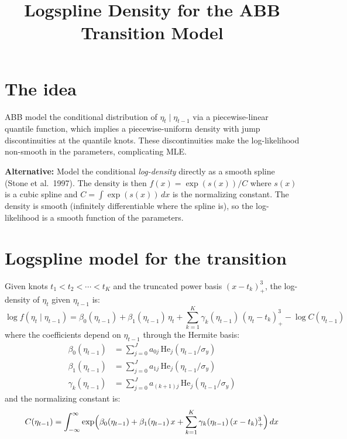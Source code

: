 \documentclass[12pt]{article}
\title{Logspline Density for the ABB Transition Model}
\author{}
\date{}
\begin{document}
\maketitle

\section{The idea}

ABB model the conditional distribution of $\eta_t \mid \eta_{t-1}$
via a piecewise-linear quantile function, which implies a
piecewise-uniform density with jump discontinuities at the
quantile knots.  These discontinuities make the log-likelihood
non-smooth in the parameters, complicating MLE.

\medskip\noindent
\textbf{Alternative:} Model the conditional \emph{log-density}
directly as a smooth spline (Stone et al.\ 1997).  The density is
then $f(x) = \exp(s(x)) / C$ where $s(x)$ is a cubic spline and
$C = \int \exp(s(x))\,dx$ is the normalizing constant.  The density
is smooth (infinitely differentiable where the spline is), so the
log-likelihood is a smooth function of the parameters.

\section{Logspline model for the transition}

Given knots $t_1 < t_2 < \cdots < t_K$ and the truncated power basis
$(x - t_k)_+^3$, the log-density of $\eta_t$ given $\eta_{t-1}$ is:
\begin{equation}
\log f(\eta_t \mid \eta_{t-1}) = \beta_0(\eta_{t-1}) + \beta_1(\eta_{t-1})\,\eta_t + \sum_{k=1}^{K} \gamma_k(\eta_{t-1})\,(\eta_t - t_k)_+^3 - \log C(\eta_{t-1})
\end{equation}
where the coefficients depend on $\eta_{t-1}$ through the Hermite basis:
\begin{align}
\beta_0(\eta_{t-1}) &= \sum_{j=0}^{J} a_{0j}\,\mathrm{He}_j(\eta_{t-1}/\sigma_y) \\
\beta_1(\eta_{t-1}) &= \sum_{j=0}^{J} a_{1j}\,\mathrm{He}_j(\eta_{t-1}/\sigma_y) \\
\gamma_k(\eta_{t-1}) &= \sum_{j=0}^{J} a_{(k+1)j}\,\mathrm{He}_j(\eta_{t-1}/\sigma_y)
\end{align}
and the normalizing constant is:
\begin{equation}
C(\eta_{t-1}) = \int_{-\infty}^{\infty} \exp\Bigl(\beta_0(\eta_{t-1}) + \beta_1(\eta_{t-1})\,x + \sum_{k=1}^{K} \gamma_k(\eta_{t-1})\,(x - t_k)_+^3\Bigr)\,dx
\end{equation}
\end{document}
